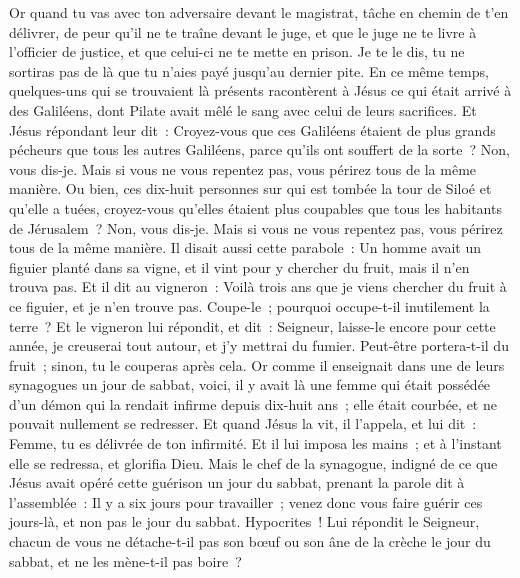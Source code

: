 \begin{multicols}{2}
Or quand tu vas avec ton adversaire devant le magistrat, tâche en chemin de t'en délivrer, de peur qu'il ne te traîne devant le juge, et que le juge ne te livre à l'officier de justice, et que celui-ci ne te mette en prison.
Je te le dis, tu ne sortiras pas de là que tu n'aies payé jusqu'au dernier pite.
\VerseOne{}En ce même temps, quelques-uns qui se trouvaient là présents racontèrent à Jésus ce qui était arrivé à des Galiléens, dont Pilate avait mêlé le sang avec celui de leurs sacrifices.
Et Jésus répondant leur dit~: Croyez-vous que ces Galiléens étaient de plus grands pécheurs que tous les autres Galiléens, parce qu'ils ont souffert de la sorte~?
Non, vous dis-je. Mais si vous ne vous repentez pas, vous périrez tous de la même manière.
Ou bien, ces dix-huit personnes sur qui est tombée la tour de Siloé et qu'elle a tuées, croyez-vous qu'elles étaient plus coupables que tous les habitants de Jérusalem~?
Non, vous dis-je. Mais si vous ne vous repentez pas, vous périrez tous de la même manière.
Il disait aussi cette parabole~: Un homme avait un figuier planté dans sa vigne, et il vint pour y chercher du fruit, mais il n'en trouva pas.
Et il dit au vigneron~: Voilà trois ans que je viens chercher du fruit à ce figuier, et je n'en trouve pas. Coupe-le~; pourquoi occupe-t-il inutilement la terre~?
Et le vigneron lui répondit, et dit~: Seigneur, laisse-le encore pour cette année, je creuserai tout autour, et j'y mettrai du fumier.
Peut-être portera-t-il du fruit~; sinon, tu le couperas après cela.
Or comme il enseignait dans une de leurs synagogues un jour de sabbat,
voici, il y avait là une femme qui était possédée d'un démon qui la rendait infirme depuis dix-huit ans~; elle était courbée, et ne pouvait nullement se redresser.
Et quand Jésus la vit, il l'appela, et lui dit~: Femme, tu es délivrée de ton infirmité.
Et il lui imposa les mains~; et à l'instant elle se redressa, et glorifia Dieu.
Mais le chef de la synagogue, indigné de ce que Jésus avait opéré cette guérison un jour du sabbat, prenant la parole dit à l'assemblée~: Il y a six jours pour travailler~; venez donc vous faire guérir ces jours-là, et non pas le jour du sabbat.
Hypocrites~! Lui répondit le Seigneur, chacun de vous ne détache-t-il pas son bœuf ou son âne de la crèche le jour du sabbat, et ne les mène-t-il pas boire~?

\end{multicols}
